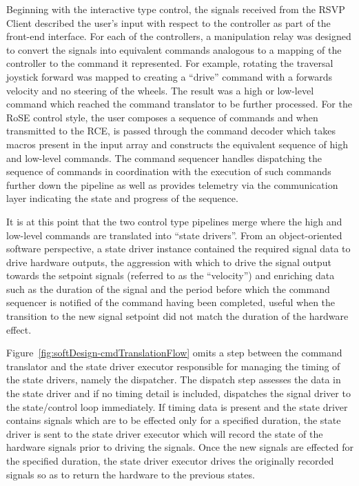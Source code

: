           Beginning with the interactive type control, the signals received from the RSVP Client described the user's input with respect to the controller as part of the front-end interface. For each of the controllers, a manipulation relay was designed to convert the signals into equivalent commands analogous to a mapping of the controller to the command it represented. For example, rotating the traversal joystick forward was mapped to creating a ``drive'' command with a forwards velocity and no steering of the wheels. The result was a high or low-level command which reached the command translator to be further processed. For the RoSE control style, the user composes a sequence of commands and when transmitted to the RCE, is passed through the command decoder which takes macros present in the input array and constructs the equivalent sequence of high and low-level commands. The command sequencer handles dispatching the sequence of commands in coordination with the execution of such commands further down the pipeline as well as provides telemetry via the communication layer indicating the state and progress of the sequence.
          
          It is at this point that the two control type pipelines merge where the high and low-level commands are translated into ``state drivers''. 
          From an object-oriented software perspective, a state driver instance contained the required signal data to drive hardware outputs, the aggression with which to drive the signal output towards the setpoint signals (referred to as the ``velocity'') and enriching data such as the duration of the signal and the period before which the command sequencer is notified of the command having been completed, useful when the transition to the new signal setpoint did not match the duration of the hardware effect.
          
          Figure~\ref{fig:softDesign-cmdTranslationFlow} omits a step between the command translator and the state driver executor responsible for managing the timing of the state drivers, namely the dispatcher. The dispatch step assesses the data in the state driver and if no timing detail is included, dispatches the signal driver to the state/control loop immediately. If timing data is present and the state driver contains signals which are to be effected only for a specified duration, the state driver is sent to the state driver executor which will record the state of the hardware signals prior to driving the signals. Once the new signals are effected for the specified duration, the state driver executor drives the originally recorded signals so as to return the hardware to the previous states.
          

